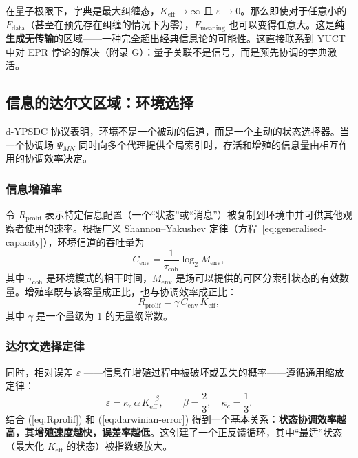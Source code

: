 \documentclass[12pt,a4paper]{article}
\theoremstyle{remark}
\newcommand{\Keff}{K_{\mathrm{eff}}}
\begin{document}
	在量子极限下，字典是最大纠缠态，$\Keff \to \infty$ 且 $\varepsilon \to 0$。那么即使对于任意小的 $F_{\text{data}}$（甚至在预先存在纠缠的情况下为零），$F_{\text{meaning}}$ 也可以变得任意大。这是\textbf{纯生成无传输}的区域——一种完全超出经典信息论的可能性。这直接联系到 YUCT 中对 EPR 悖论的解决（附录 G）：量子关联不是信号，而是预先协调的字典激活。
	
	\subsection{信息的达尔文区域：环境选择}
	\label{subsec:darwinian-regime}
	
	d-YPSDC 协议表明，环境不是一个被动的信道，而是一个主动的状态选择器。当一个协调场 \(\Psi_{MN}\) 同时向多个代理提供全局索引时，存活和增殖的信息量由相互作用的协调效率决定。
	
	\subsubsection*{信息增殖率}
	令 \(R_{\mathrm{prolif}}\) 表示特定信息配置（一个“状态”或“消息”）被复制到环境中并可供其他观察者使用的速率。根据广义 Shannon–Yakushev 定律（方程~\ref{eq:generalised-capacity}），环境信道的吞吐量为
	\[
	C_{\mathrm{env}} = \frac{1}{\tau_{\mathrm{coh}}} \log_2 M_{\mathrm{env}},
	\]
	其中 \(\tau_{\mathrm{coh}}\) 是环境模式的相干时间，\(M_{\mathrm{env}}\) 是场可以提供的可区分索引状态的有效数量。增殖率既与该容量成正比，也与协调效率成正比：
	\begin{equation}
		R_{\mathrm{prolif}} = \gamma \, C_{\mathrm{env}} \, K_{\mathrm{eff}},
		\label{eq:Rprolif}
	\end{equation}
	其中 \(\gamma\) 是一个量级为 1 的无量纲常数。
	
	\subsubsection*{达尔文选择定律}
	同时，相对误差 \(\varepsilon\) ——信息在增殖过程中被破坏或丢失的概率——遵循通用缩放定律：
	\begin{equation}
		\varepsilon = \kappa_c \, \alpha \, K_{\mathrm{eff}}^{-\beta},
		\qquad \beta = \frac{2}{3},\quad \kappa_c = \frac{1}{3}.
		\label{eq:darwinian-error}
	\end{equation}
	结合 (\ref{eq:Rprolif}) 和 (\ref{eq:darwinian-error}) 得到一个基本关系：\textbf{状态协调效率越高，其增殖速度越快，误差率越低}。这创建了一个正反馈循环，其中“最适”状态（最大化 \(K_{\mathrm{eff}}\) 的状态）被指数级放大。
	
\end{document}
